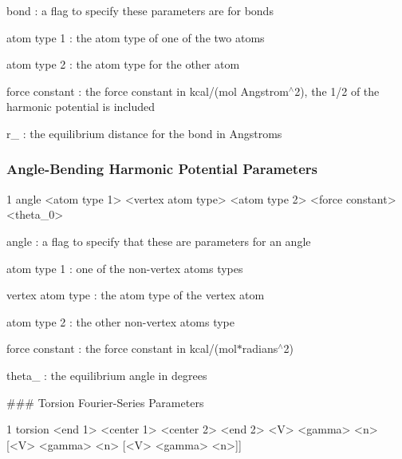 \begin{DoxyItemize}
\item {\ttfamily bond} \+: a flag to specify these parameters are for bonds
\item {\ttfamily atom type 1} \+: the atom type of one of the two atoms
\item {\ttfamily atom type 2} \+: the atom type for the other atom
\item {\ttfamily force constant} \+: the force constant in kcal/(mol Angstrom$^\wedge$2), the 1/2 of the harmonic potential is included
\item {\ttfamily r\+\_} \+: the equilibrium distance for the bond in Angstroms
\end{DoxyItemize}

\subsubsection*{Angle-\/\+Bending Harmonic Potential Parameters}


\begin{DoxyCode}
1 angle  <atom type 1> <vertex atom type> <atom type 2> <force constant> <theta\_0>
\end{DoxyCode}



\begin{DoxyItemize}
\item {\ttfamily angle} \+: a flag to specify that these are parameters for an angle
\item {\ttfamily atom type 1} \+: one of the non-\/vertex atoms\textquotesingle{} types
\item {\ttfamily vertex atom type} \+: the atom type of the vertex atom
\item {\ttfamily atom type 2} \+: the other non-\/vertex atom\textquotesingle{}s type
\item {\ttfamily force constant} \+: the force constant in kcal/(mol$\ast$radians$^\wedge$2)
\item {\ttfamily theta\+\_} \+: the equilibrium angle in degrees
\end{DoxyItemize}

\#\#\# Torsion Fourier-\/\+Series Parameters 
\begin{DoxyCode}
1 torsion <end 1> <center 1> <center 2> <end 2> <V> <gamma> <n> [<V> <gamma> <n> [<V> <gamma> <n>]] 
\end{DoxyCode}



